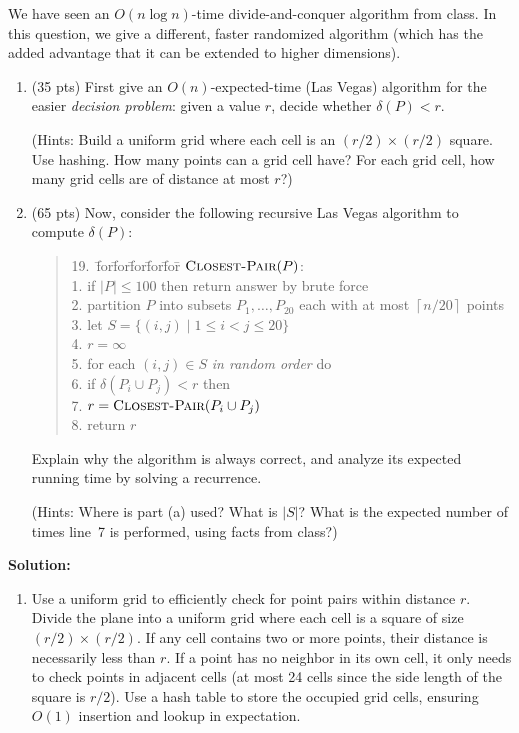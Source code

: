 \documentclass[11pt]{article}
\newcommand{\ceil}[1]{\left\lceil #1\right\rceil}
\begin{document}
\begin{description}
We have seen an $O(n\log n)$-time divide-and-conquer algorithm from class.
In this question, we give a different, faster randomized algorithm
(which has the added advantage that it can be
extended to higher dimensions).

\begin{enumerate}
\item[(a)] (35 pts) First give an $O(n)$-expected-time (Las Vegas) algorithm for
 the easier \emph{decision problem}: given
a value $r$, decide whether $\delta(P)<r$.  

(Hints: Build a uniform grid where each cell is an
$(r/2)\times(r/2)$ square.  Use hashing.
How many points can a grid cell have?
For each grid cell, how many grid cells are of distance at most 
$r$?)

\medskip
\item[(b)] (65 pts) Now, consider the following recursive Las Vegas algorithm 
to compute $\delta(P)$:

\newcommand{\ClosestPair}{\textsc{Closest-Pair}}
\begin{quote}
\begin{tabbing}
19.\ \= for\= for\= for\= for\= for\=\kill
$\ClosestPair(P)$:\\[2pt]
1.\> if $|P|\le 100$ then return answer by brute force\\
2.\> partition $P$ into subsets $P_1,\ldots,P_{20}$ each with 
at most $\ceil{n/20}$ points\\
3.\> let $S=\{(i,j)\mid 1\le i<j\le 20\}$\\
4.\> $r=\infty$\\
5.\> for each $(i,j)\in S$ {\em in random order\/} do\\
6.\>\> if $\delta(P_i\cup P_j) < r$ then\\
7.\>\>\> $r=\ClosestPair(P_i\cup P_j)$\\
8.\> return $r$
\end{tabbing}
\end{quote}

Explain why the algorithm is always correct,
and analyze its expected running time by solving a recurrence.

(Hints: Where is part (a) used?  What is $|S|$?  What is the expected number of times 
line~7 is performed, using facts from class?)
\end{enumerate}


\newpage
\textbf{Solution:}
\begin{enumerate}
  \item[(a)] 
  Use a uniform grid to efficiently check for point pairs within distance $r$. 
  Divide the plane into a uniform grid where each cell is a square of size $(r/2) \times (r/2)$.
  If any cell contains two or more points, their distance is necessarily less than $r$.
  If a point has no neighbor in its own cell, 
  it only needs to check points in adjacent cells (at most 24 cells since the side length
  of the square is $r/2$).
  Use a hash table to store the occupied grid cells, ensuring $O(1)$ insertion and lookup in expectation.


\end{enumerate}
\end{description}
\end{document}
